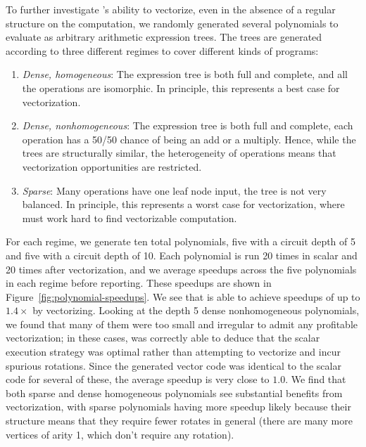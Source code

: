 To further investigate \system's ability to vectorize, even in the absence of a regular structure on the computation, we randomly generated several polynomials to evaluate as arbitrary arithmetic expression trees.
The trees are generated according to three different regimes to cover different kinds of programs: 
\begin{enumerate}
    \item {\em Dense, homogeneous}: The expression tree is both full and complete, and all the operations are isomorphic. In principle, this represents a best case for vectorization.
    \item {\em Dense, nonhomogeneous}: The expression tree is both full and complete, each operation has a 50/50 chance of being an add or a multiply. Hence, while the trees are structurally similar, the heterogeneity of operations means that vectorization opportunities are restricted.
	\item {\em Sparse}: Many operations have one leaf node input, the tree is not very balanced. In principle, this represents a worst case for vectorization, where \system must work hard to find vectorizable computation.
\end{enumerate}
For each regime, we generate ten total polynomials, five with a circuit depth of 5 and five with a circuit depth of 10.
Each polynomial is run 20 times in scalar and 20 times after vectorization, and we average speedups across the five polynomials in each regime before reporting.
These speedups are shown in Figure~\ref{fig:polynomial-speedups}.
We see that \system is able to achieve speedups of up to $1.4\times$ by vectorizing.
Looking at the depth 5 dense nonhomogeneous polynomials, we found that many of them were too small and irregular to admit any profitable vectorization; in these cases, \system was correctly able to deduce that the scalar execution strategy was optimal rather than attempting to vectorize and incur spurious rotations.
Since the generated vector code was identical to the scalar code for several of these, the average speedup is very close to $1.0$.
We find that both sparse and dense homogeneous polynomials see substantial benefits from vectorization, with sparse polynomials having more speedup likely because their structure means that they require fewer rotates in general (there are many more vertices of arity 1, which don't require any rotation).

